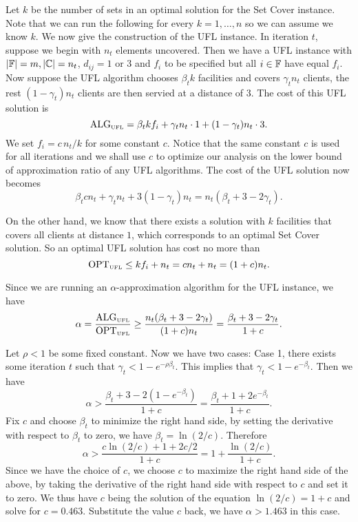 \documentclass[oneside,final]{ucr}
\begin{document}
Let $k$ be the number of sets in an optimal solution for the
Set Cover instance. Note that we can run the following for
every $k=1,\ldots,n$ so we can assume we know $k$.  We now
give the construction of the UFL instance. In iteration $t$,
suppose we begin with $n_t$ elements uncovered. Then we have
a UFL instance with $|\mathbb{F}| = m, |\mathbb{C}| = n_t$,
$d_{ij} = 1 \text{ or } 3$ and $f_i$ to be specified but all
$i\in\mathbb{F}$ have equal $f_i$. Now suppose the UFL
algorithm chooses $\beta_t k$ facilities and covers
$\gamma_t n_t$ clients, the rest $(1-\gamma_t) n_t$ clients
are then servied at a distance of $3$. The cost of this UFL
solution is
\begin{equation*}
  \mbox{\rm ALG}_{\mbox{\tiny\rm UFL}} = \beta_t k f_i + \gamma_t n_t \cdot 1 + (1 -
  \gamma_t) n_t \cdot 3.
\end{equation*}
We set $f_i = c\,n_t / k$ for some constant $c$. Notice
that the same constant $c$ is used for all iterations and we
shall use $c$ to optimize our analysis on the lower bound of
approximation ratio of any UFL algorithms. The cost of the
UFL solution now becomes
\begin{equation*}
  \beta_t c n_t + \gamma_t n_t + 3 (1-\gamma_t) n_t = n_t
  (\beta_t + 3 - 2\gamma_t).
\end{equation*}

On the other hand, we know that there exists a solution with
$k$ facilities that covers all clients at distance $1$,
which corresponds to an optimal Set Cover solution. So an
optimal UFL solution has cost no more than
\begin{equation*}
  \mbox{\rm OPT}_{\mbox{\tiny\rm UFL}} \leq k f_i + n_t = c n_t + n_t = (1+c)n_t.
\end{equation*}

Since we are running an $\alpha$-approximation algorithm for
the UFL instance, we have
\begin{equation*}
  \alpha =\frac{\mbox{\rm ALG}_{\mbox{\tiny\rm UFL}}}{\mbox{\rm OPT}_{\mbox{\tiny\rm UFL}}} \geq \frac{n_t
  (\beta_t + 3 - 2\gamma_t)}{(1+c)n_t} = \frac{\beta_t + 3 -
2\gamma_t}{1+c}.
\end{equation*}

Let $\rho < 1$ be some fixed constant. Now we have two
cases: Case 1, there exists some iteration $t$ such that
$\gamma_t < 1 - e^{-\rho\beta_t}$. This implies that
$\gamma_t < 1 - e^{-\beta_t}$. Then we have
\begin{equation*}
  \alpha > \frac{\beta_t + 3 - 2 (1 - e^{-\beta_t})}{1+c} =
  \frac{\beta_t + 1 + 2 e^{-\beta_t}}{1+c}.
\end{equation*}
Fix $c$ and choose $\beta_t$ to minimize the right hand
side, by setting the derivative with respect to $\beta_t$ to
zero, we have $\beta_t = \ln (2/c)$. Therefore
\begin{equation*}
  \alpha > \frac{c \ln (2/c) + 1 + 2 c/2}{1 +
  c} = 1 + \frac{\ln (2/c)}{1+c}.
\end{equation*}
Since we have the choice of $c$, we choose $c$ to maximize
the right hand side of the above, by taking the derivative
of the right hand side with respect to $c$ and set it to
zero. We thus have $c$ being the solution of the equation
$\ln (2/c) = 1+c$ and solve for $c=0.463$. Substitute the
value $c$ back, we have $\alpha > 1.463$ in this case.
\end{document}
